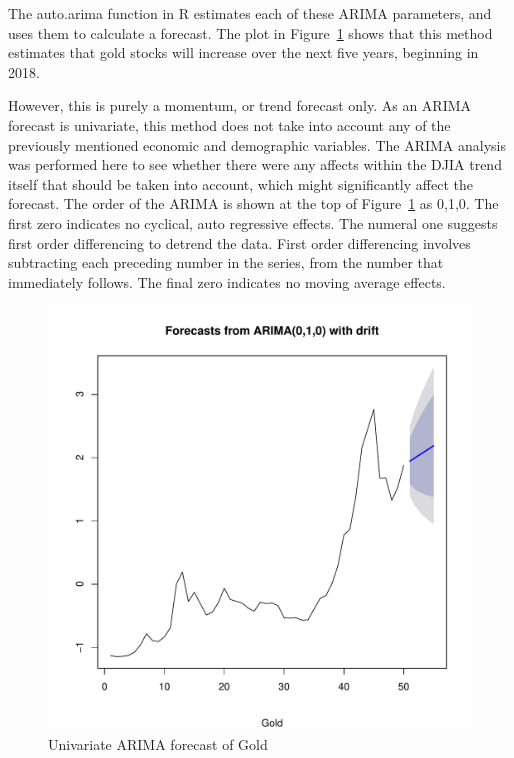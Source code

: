 \documentclass[12pt]{article}         %
\begin{document}
The auto.arima function in R estimates each of these ARIMA parameters, and uses them to calculate a forecast.  The plot in Figure~\ref{fig:Arima} shows that this method estimates that gold stocks will increase over the next five years, beginning in 2018. 

However, this is purely a momentum, or trend forecast only.  As an ARIMA forecast is univariate, this method does not take into account any of the previously mentioned economic and demographic variables.  The ARIMA analysis was performed here to see whether there were any affects within the DJIA trend itself that should be taken into account, which might significantly affect the forecast.  The order of the ARIMA is shown at the top of Figure~\ref{fig:Arima} as 0,1,0.  The first zero indicates no cyclical, auto regressive effects.  The numeral one suggests first order differencing to detrend the data.  First order differencing involves subtracting each preceding number in the series, from the number that immediately follows.  The final zero indicates no moving average effects.

\begin{figure}[h!]
\begin{center}
\includegraphics[width=\linewidth]{plots/Gold_arima.pdf}
\caption{Univariate ARIMA forecast of Gold}
\label{fig:Arima}
\end{center}
\end{figure}
\end{document}
